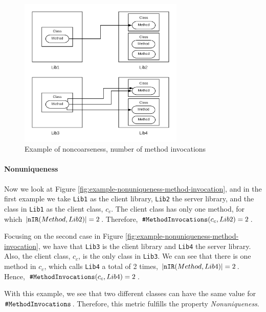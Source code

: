 \begin{figure}[ht]
\begin{center}
\includegraphics[width=0.7\textwidth]{figures/Example-Distribution-1.png}
\caption{Example of noncoarseness, number of method invocations}
\label{fig:example-noncoarseness-method-invocation}
\end{center}
\end{figure}

\paragraph{Nonuniqueness}
Now we look at Figure \ref{fig:example-nonuniqueness-method-invocation}, and in the first example we take \texttt{Lib1} as the client library, \texttt{Lib2} the server library, and the class in \texttt{Lib1} as the client class, $c_c$. The client class has only one method, for which $|\verb|nIR|(Method, Lib2)| = 2$. Therefore, $\verb|#MethodInvocations|(c_c, Lib2) = 2$.

Focusing on the second case in Figure \ref{fig:example-nonuniqueness-method-invocation}, we have that \texttt{Lib3} is the client library and \texttt{Lib4} the server library. Also, the client class, $c_c$, is the only class in \texttt{Lib3}. We can see that there is one method in $c_c$, which calls \texttt{Lib4} a total of 2 times, $|\verb|nIR|(Method, Lib4)| = 2$. Hence, $\verb|#MethodInvocations|(c_c, Lib4) = 2$.

With this example, we see that two different classes can have the same value for $\verb|#MethodInvocations|$. Therefore, this metric fulfills the property \textit{Nonuniqueness}.

